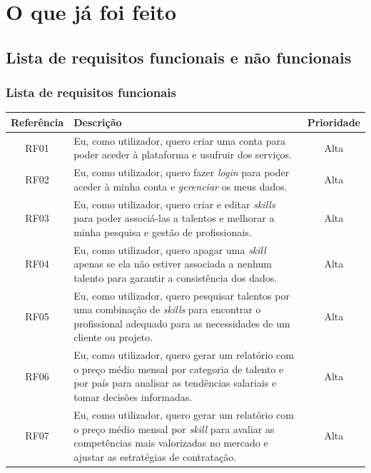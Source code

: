 \section{O que já foi feito}

\subsection{Lista de requisitos funcionais e não funcionais}
\subsubsection{Lista de requisitos funcionais}

\renewcommand{\arraystretch}{1.3}
\begin{center} %
\begin{longtable}{|c|p{9cm}|c|} %
    \hline
    \textbf{Referência} & \textbf{Descrição} & \textbf{Prioridade} \\
    \hline
    RF01 & Eu, como utilizador, quero criar uma conta para poder aceder à plataforma e usufruir dos serviços. & Alta \\
    \hline
    RF02 & Eu, como utilizador, quero fazer \textit{login} para poder aceder à minha conta e \textit{gerenciar} os meus dados. & Alta \\
    \hline
    RF03 & Eu, como utilizador, quero criar e editar \textit{skills} para poder associá-las a talentos e melhorar a minha pesquisa e gestão de profissionais. & Alta \\
    \hline
    RF04 & Eu, como utilizador, quero apagar uma \textit{skill} apenas se ela não estiver associada a nenhum talento para garantir a consistência dos dados. & Alta \\
    \hline
    RF05 & Eu, como utilizador, quero pesquisar talentos por uma combinação de \textit{skills} para encontrar o profissional adequado para as necessidades de um cliente ou projeto. & Alta \\
    \hline
    RF06 & Eu, como utilizador, quero gerar um relatório com o preço médio mensal por categoria de talento e por país para analisar as tendências salariais e tomar decisões informadas. & Alta \\
    \hline
    RF07 & Eu, como utilizador, quero gerar um relatório com o preço médio mensal por \textit{skill} para avaliar as competências mais valorizadas no mercado e ajustar as estratégias de contratação. & Alta \\
    \hline

\end{longtable}
\end{center}
